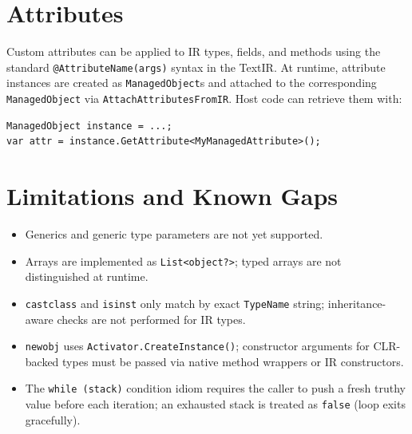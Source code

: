 \documentclass[11pt,a4paper]{article}
\begin{document}
\section{Attributes}

Custom attributes can be applied to IR types, fields, and methods using
the standard \texttt{@AttributeName(args)} syntax in the TextIR.  At
runtime, attribute instances are created as \texttt{ManagedObject}s and
attached to the corresponding \texttt{ManagedObject} via
\texttt{AttachAttributesFromIR}.  Host code can retrieve them with:

\begin{lstlisting}[language={[Sharp]C}]
ManagedObject instance = ...;
var attr = instance.GetAttribute<MyManagedAttribute>();
\end{lstlisting}

\section{Limitations and Known Gaps}

\begin{itemize}
  \item Generics and generic type parameters are not yet supported.
  \item Arrays are implemented as \texttt{List<object?>}; typed arrays
        are not distinguished at runtime.
  \item \texttt{castclass} and \texttt{isinst} only match by exact
        \texttt{TypeName} string; inheritance-aware checks are not
        performed for IR types.
  \item \texttt{newobj} uses \texttt{Activator.CreateInstance()};
        constructor arguments for CLR-backed types must be passed via
        native method wrappers or IR constructors.
  \item The \texttt{while (stack)} condition idiom requires the caller to
        push a fresh truthy value before each iteration; an exhausted
        stack is treated as \texttt{false} (loop exits gracefully).
\end{itemize}
\end{document}
